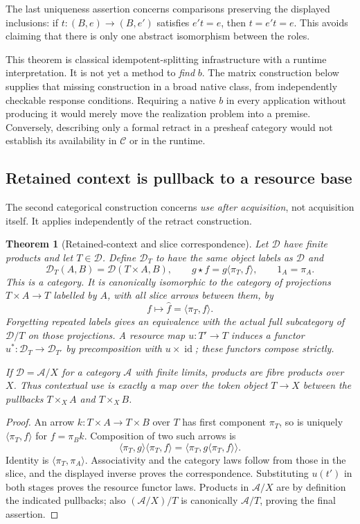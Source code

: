 \documentclass[11pt]{article}
\newtheorem{theorem}{Theorem}[section]
\theoremstyle{definition}
\theoremstyle{remark}
\newcommand{\id}{\operatorname{id}}
\begin{document}
The last uniqueness assertion concerns comparisons preserving the displayed inclusions: if $t:(B,e)\to(B,e')$ satisfies $e't=e$, then $t=e't=e$. This avoids claiming that there is only one abstract isomorphism between the roles.

This theorem is classical idempotent-splitting infrastructure with a runtime interpretation. It is not yet a method to \emph{find} $b$. The matrix construction below supplies that missing construction in a broad native class, from independently checkable response conditions. Requiring a native $b$ in every application without producing it would merely move the realization problem into a premise. Conversely, describing only a formal retract in a presheaf category would not establish its availability in $\mathcal C$ or in the runtime.



\subsection{Retained context is pullback to a resource base}
The second categorical construction concerns \emph{use after acquisition}, not acquisition itself. It applies independently of the retract construction.

\begin{theorem}[Retained-context and slice correspondence]\label{thm:context}
Let $\mathcal D$ have finite products and let $T\in\mathcal D$. Define $\mathcal D_T$ to have the same object labels as $\mathcal D$ and
\[
 \mathcal D_T(A,B)=\mathcal D(T\times A,B),\qquad
 g\star f=g\langle\pi_T,f\rangle,
 \qquad 1_A=\pi_A.
\]
This is a category. It is canonically isomorphic to the category of projections $T\times A\to T$ labelled by $A$, with all slice arrows between them, by
\[
 f\longmapsto\widehat f=\langle\pi_T,f\rangle.
\]
Forgetting repeated labels gives an equivalence with the actual full subcategory of $\mathcal D/T$ on those projections. A resource map $u:T'\to T$ induces a functor $u^*: \mathcal D_T\to\mathcal D_{T'}$ by precomposition with $u\times\id$; these functors compose strictly.

If $\mathcal D=\mathcal A/X$ for a category $\mathcal A$ with finite limits, products are fibre products over $X$. Thus contextual use is exactly a map over the token object $T\to X$ between the pullbacks $T\times_X A$ and $T\times_X B$.
\end{theorem}
\begin{proof}
An arrow $k:T\times A\to T\times B$ over $T$ has first component $\pi_T$, so is uniquely $\langle\pi_T,f\rangle$ for $f=\pi_Bk$. Composition of two such arrows is
\[
 \langle\pi_T,g\rangle\langle\pi_T,f\rangle
 =\langle\pi_T,g\langle\pi_T,f\rangle\rangle.
\]
Identity is $\langle\pi_T,\pi_A\rangle$. Associativity and the category laws follow from those in the slice, and the displayed inverse proves the correspondence. Substituting $u(t')$ in both stages proves the resource functor laws. Products in $\mathcal A/X$ are by definition the indicated pullbacks; also $(\mathcal A/X)/T$ is canonically $\mathcal A/T$, proving the final assertion.
\end{proof}
\end{document}
